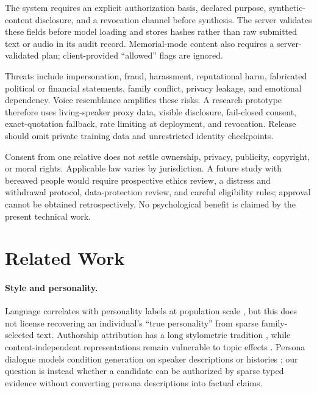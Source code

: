 \documentclass[11pt,a4paper]{article}
\begin{document}
The system requires an explicit authorization basis, declared purpose,
synthetic-content disclosure, and a revocation channel before synthesis.  The
server validates these fields before model loading and stores hashes rather
than raw submitted text or audio in its audit record.  Memorial-mode content
also requires a server-validated plan; client-provided ``allowed'' flags are
ignored.

Threats include impersonation, fraud, harassment, reputational harm, fabricated
political or financial statements, family conflict, privacy leakage, and
emotional dependency.  Voice resemblance amplifies these risks.  A research
prototype therefore uses living-speaker proxy data, visible disclosure,
fail-closed consent, exact-quotation fallback, rate limiting at deployment, and
revocation.  Release should omit private training data and unrestricted
identity checkpoints.

Consent from one relative does not settle ownership, privacy, publicity,
copyright, or moral rights.  Applicable law varies by jurisdiction.  A future
study with bereaved people would require prospective ethics review, a distress
and withdrawal protocol, data-protection review, and careful eligibility rules;
approval cannot be obtained retrospectively.  No psychological benefit is
claimed by the present technical work.

\section{Related Work}

\paragraph{Style and personality.}
Language correlates with personality labels at population scale
\citep{mairesse2007linguistic,schwartz2013personality}, but this does not license
recovering an individual's ``true personality'' from sparse family-selected
  text.  Authorship attribution has a long stylometric tradition
  \citep{stamatatos2009survey}, while content-independent representations remain
  vulnerable to topic effects \citep{wegmann-etal-2022-author}. Persona dialogue
  models condition generation on speaker descriptions or histories
  \citep{li2016persona,zhang2018personalizing}; our question is instead whether a
  candidate can be authorized by sparse typed evidence without converting
  persona descriptions into factual claims.
\end{document}
